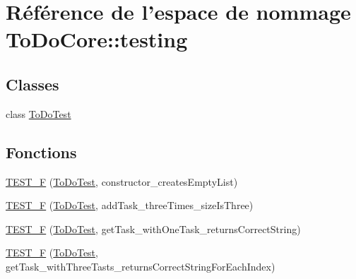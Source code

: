 \hypertarget{namespace_to_do_core_1_1testing}{\section{Référence de l'espace de nommage To\+Do\+Core\+:\+:testing}
\label{namespace_to_do_core_1_1testing}
}
\subsection*{Classes}
\begin{DoxyCompactItemize}
\item 
class \hyperlink{class_to_do_core_1_1testing_1_1_to_do_test}{To\+Do\+Test}
\end{DoxyCompactItemize}
\subsection*{Fonctions}
\begin{DoxyCompactItemize}
\item 
\hyperlink{namespace_to_do_core_1_1testing_a8856a84197dfa84ec81d14bd227c2264}{T\+E\+S\+T\+\_\+\+F} (\hyperlink{class_to_do_core_1_1testing_1_1_to_do_test}{To\+Do\+Test}, constructor\+\_\+creates\+Empty\+List)
\item 
\hyperlink{namespace_to_do_core_1_1testing_ad1ff01cd7b75e9ba48225bbde5f1bb2b}{T\+E\+S\+T\+\_\+\+F} (\hyperlink{class_to_do_core_1_1testing_1_1_to_do_test}{To\+Do\+Test}, add\+Task\+\_\+three\+Times\+\_\+size\+Is\+Three)
\item 
\hyperlink{namespace_to_do_core_1_1testing_a8d6cdf71a6d2d85a7d6dc6e4ced72c51}{T\+E\+S\+T\+\_\+\+F} (\hyperlink{class_to_do_core_1_1testing_1_1_to_do_test}{To\+Do\+Test}, get\+Task\+\_\+with\+One\+Task\+\_\+returns\+Correct\+String)
\item 
\hyperlink{namespace_to_do_core_1_1testing_ae6f99ee22a68254ccf5750d1788cd082}{T\+E\+S\+T\+\_\+\+F} (\hyperlink{class_to_do_core_1_1testing_1_1_to_do_test}{To\+Do\+Test}, get\+Task\+\_\+with\+Three\+Tasts\+\_\+returns\+Correct\+String\+For\+Each\+Index)
\end{DoxyCompactItemize}


